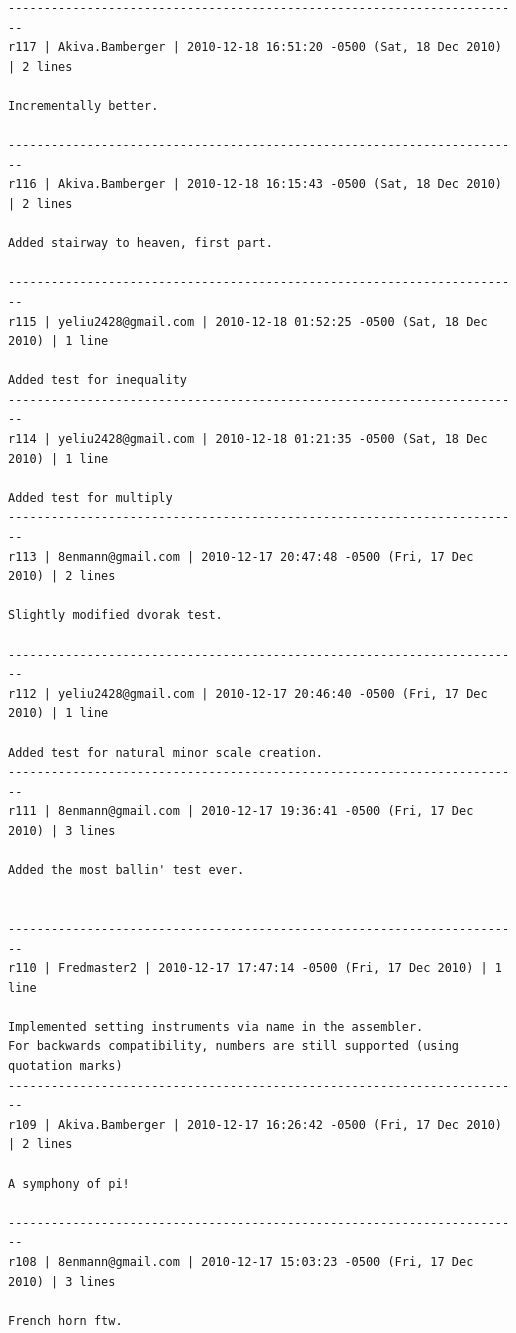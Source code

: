 \documentclass[12pt,A4]{book}
\begin{document}
\begin{verbatim}
------------------------------------------------------------------------
r117 | Akiva.Bamberger | 2010-12-18 16:51:20 -0500 (Sat, 18 Dec 2010) | 2 lines

Incrementally better.

------------------------------------------------------------------------
r116 | Akiva.Bamberger | 2010-12-18 16:15:43 -0500 (Sat, 18 Dec 2010) | 2 lines

Added stairway to heaven, first part.

------------------------------------------------------------------------
r115 | yeliu2428@gmail.com | 2010-12-18 01:52:25 -0500 (Sat, 18 Dec 2010) | 1 line

Added test for inequality
------------------------------------------------------------------------
r114 | yeliu2428@gmail.com | 2010-12-18 01:21:35 -0500 (Sat, 18 Dec 2010) | 1 line

Added test for multiply
------------------------------------------------------------------------
r113 | 8enmann@gmail.com | 2010-12-17 20:47:48 -0500 (Fri, 17 Dec 2010) | 2 lines

Slightly modified dvorak test.

------------------------------------------------------------------------
r112 | yeliu2428@gmail.com | 2010-12-17 20:46:40 -0500 (Fri, 17 Dec 2010) | 1 line

Added test for natural minor scale creation.
------------------------------------------------------------------------
r111 | 8enmann@gmail.com | 2010-12-17 19:36:41 -0500 (Fri, 17 Dec 2010) | 3 lines

Added the most ballin' test ever.


------------------------------------------------------------------------
r110 | Fredmaster2 | 2010-12-17 17:47:14 -0500 (Fri, 17 Dec 2010) | 1 line

Implemented setting instruments via name in the assembler.
For backwards compatibility, numbers are still supported (using quotation marks)
------------------------------------------------------------------------
r109 | Akiva.Bamberger | 2010-12-17 16:26:42 -0500 (Fri, 17 Dec 2010) | 2 lines

A symphony of pi!

------------------------------------------------------------------------
r108 | 8enmann@gmail.com | 2010-12-17 15:03:23 -0500 (Fri, 17 Dec 2010) | 3 lines

French horn ftw.



\end{verbatim}
\end{document}
